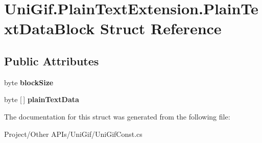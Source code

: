 \hypertarget{struct_uni_gif_1_1_plain_text_extension_1_1_plain_text_data_block}{}\section{Uni\+Gif.\+Plain\+Text\+Extension.\+Plain\+Text\+Data\+Block Struct Reference}
\label{struct_uni_gif_1_1_plain_text_extension_1_1_plain_text_data_block}
\subsection*{Public Attributes}
\begin{DoxyCompactItemize}
\item 
\mbox{\label{struct_uni_gif_1_1_plain_text_extension_1_1_plain_text_data_block_afd6d9ba7ad4ff5d060e5431203b5493b}} 
byte {\bfseries block\+Size}
\item 
\mbox{\label{struct_uni_gif_1_1_plain_text_extension_1_1_plain_text_data_block_ac21ffc57510bdeb700b8350fffe230ca}} 
byte \mbox{[}$\,$\mbox{]} {\bfseries plain\+Text\+Data}
\end{DoxyCompactItemize}


The documentation for this struct was generated from the following file\+:\begin{DoxyCompactItemize}
\item 
Project/\+Other A\+P\+Is/\+Uni\+Gif/Uni\+Gif\+Const.\+cs\end{DoxyCompactItemize}
